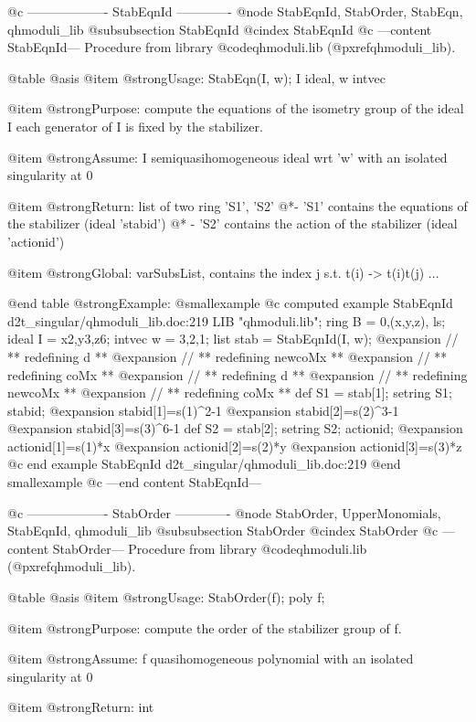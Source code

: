 @c ------------------- StabEqnId -------------
@node StabEqnId, StabOrder, StabEqn, qhmoduli_lib
@subsubsection StabEqnId
@cindex StabEqnId
@c ---content StabEqnId---
Procedure from library @code{qhmoduli.lib} (@pxref{qhmoduli_lib}).

@table @asis
@item @strong{Usage:}
StabEqn(I, w); I ideal, w intvec

@item @strong{Purpose:}
compute the equations of the isometry group of the ideal I
each generator of I is fixed by the stabilizer.

@item @strong{Assume:}
I semiquasihomogeneous ideal wrt 'w' with an isolated singularity at 0

@item @strong{Return:}
list of two ring 'S1', 'S2'
@*- 'S1' contains the equations of the stabilizer (ideal 'stabid') @*
- 'S2' contains the action of the stabilizer (ideal 'actionid')

@item @strong{Global:}
varSubsList, contains the index j s.t. t(i) -> t(i)t(j) ...

@end table
@strong{Example:}
@smallexample
@c computed example StabEqnId d2t_singular/qhmoduli_lib.doc:219 
LIB "qhmoduli.lib";
ring B   = 0,(x,y,z), ls;
ideal I = x2,y3,z6;
intvec w = 3,2,1;
list stab = StabEqnId(I, w);
@expansion{} // ** redefining d **
@expansion{} // ** redefining newcoMx **
@expansion{} // ** redefining coMx **
@expansion{} // ** redefining d **
@expansion{} // ** redefining newcoMx **
@expansion{} // ** redefining coMx **
def S1 = stab[1]; setring S1;  stabid;
@expansion{} stabid[1]=s(1)^2-1
@expansion{} stabid[2]=s(2)^3-1
@expansion{} stabid[3]=s(3)^6-1
def S2 = stab[2]; setring S2;  actionid;
@expansion{} actionid[1]=s(1)*x
@expansion{} actionid[2]=s(2)*y
@expansion{} actionid[3]=s(3)*z
@c end example StabEqnId d2t_singular/qhmoduli_lib.doc:219
@end smallexample
@c ---end content StabEqnId---

@c ------------------- StabOrder -------------
@node StabOrder, UpperMonomials, StabEqnId, qhmoduli_lib
@subsubsection StabOrder
@cindex StabOrder
@c ---content StabOrder---
Procedure from library @code{qhmoduli.lib} (@pxref{qhmoduli_lib}).

@table @asis
@item @strong{Usage:}
StabOrder(f); poly f;

@item @strong{Purpose:}
compute the order of the stabilizer group of f.

@item @strong{Assume:}
f quasihomogeneous polynomial with an isolated singularity at 0

@item @strong{Return:}
int

